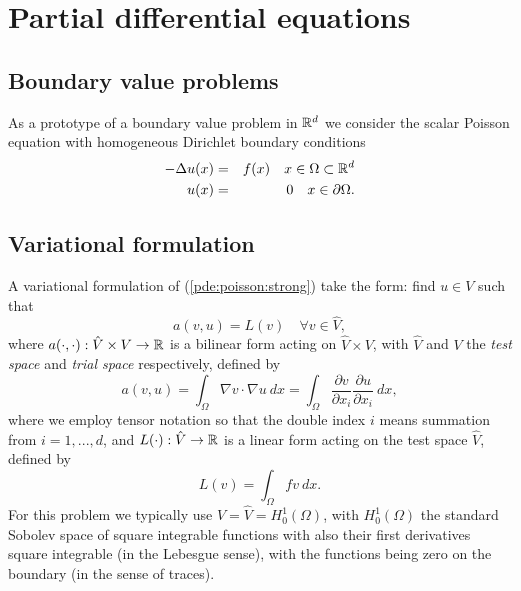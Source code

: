 \chapter{Partial differential equations}
\label{sec:pde}

\section{Boundary value problems}

As a prototype of a boundary value problem in $\Bbb{R}^d$ we consider the 
scalar Poisson equation with homogeneous Dirichlet boundary conditions 
\begin{eqnarray}
-\Delta u(x)&=&f(x) \quad x\in \Omega \subset \Bbb{R}^d \label{pde:poisson:strong} \\
u(x)&=&0 \quad x\in \partial \Omega. \nonumber  
\end{eqnarray}

\section{Variational formulation}

A variational formulation of (\ref{pde:poisson:strong}) take the form: 
find $u\in V$ such that  
\begin{equation}\label{pde:poisson:weak}
a(v,u)=L(v) \quad \forall v\in \hat V, 
\end{equation}
where $a(\cdot,\cdot):\hat V\times V\rightarrow \Bbb{R}$ is a bilinear form 
acting on $\hat V \times V$, with $\hat V$ and $V$ the {\em test space} and {\em trial space} 
respectively, defined by 
\begin{equation}
a(v,u)=\int_{\Omega} \nabla v \cdot \nabla u ~dx 
=\int_{\Omega} \frac{\partial v}{\partial x_i} \frac{\partial u}{\partial x_i} ~ dx,  
\end{equation}
where we employ tensor notation so that the double index $i$ means summation from $i=1,...,d$, 
and $L(\cdot):\hat V\rightarrow \Bbb{R}$ is a linear form acting on the test space $\hat V$,  
defined by 
\begin{equation}
L(v)=\int_{\Omega} f v ~dx.  
\end{equation}
For this problem we typically use $V=\hat V=H^1_0(\Omega)$, with $H^1_0(\Omega)$ 
the standard Sobolev space of square integrable functions with also their first 
derivatives square integrable (in the Lebesgue sense), 
with the functions being zero on the boundary (in the sense of traces).   

